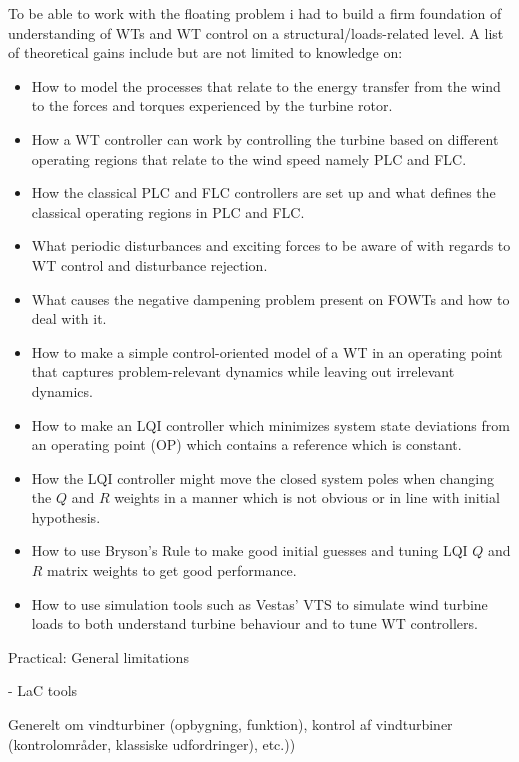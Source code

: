 To be able to work with the floating problem i had to build a firm foundation of understanding of WTs and WT control on a structural/loads-related level. A list of theoretical gains include but are not limited to knowledge on:
\begin{itemize}
	\item How to model the processes that relate to the energy transfer from the wind to the forces and torques experienced by the turbine rotor.
	\item How a WT controller can work by controlling the turbine based on different operating regions that relate to the wind speed namely PLC and FLC.
	\item How the classical PLC and FLC controllers are set up and what defines the classical operating regions in PLC and FLC.
	\item What periodic disturbances and exciting forces to be aware of with regards to WT control and disturbance rejection.
	\item What causes the negative dampening problem present on FOWTs and how to deal with it.
	\item How to make a simple control-oriented model of a WT in an operating point that captures problem-relevant dynamics while leaving out irrelevant dynamics.
	\item How to make an LQI controller which minimizes system state deviations from an operating point (OP) which contains a reference which is constant.
	\item How the LQI controller might move the closed system poles when changing the $ Q $ and $ R $ weights in a manner which is not obvious or in line with initial hypothesis.
	\item How to use Bryson's Rule to make good initial guesses and tuning LQI $ Q $ and $ R $ matrix weights to get good performance.
	\item How to use simulation tools such as Vestas' VTS to simulate wind turbine loads to both understand turbine behaviour and to tune WT controllers.
\end{itemize}

Practical:
General limitations

- LaC tools

Generelt om vindturbiner (opbygning, funktion), kontrol af vindturbiner (kontrolområder, klassiske udfordringer), etc.))

